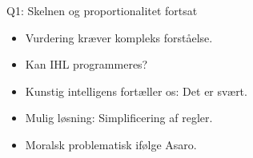 \begin{frame}{Q1: Skelnen og proportionalitet fortsat}
  \begin{itemize}
    \item Vurdering kræver kompleks forståelse.
    \item Kan IHL programmeres?
\pause
    \item Kunstig intelligens fortæller os: Det er svært.
\pause
    \item Mulig løsning: Simplificering af regler.
    \item Moralsk problematisk ifølge Asaro.
  \end{itemize}
\end{frame}
